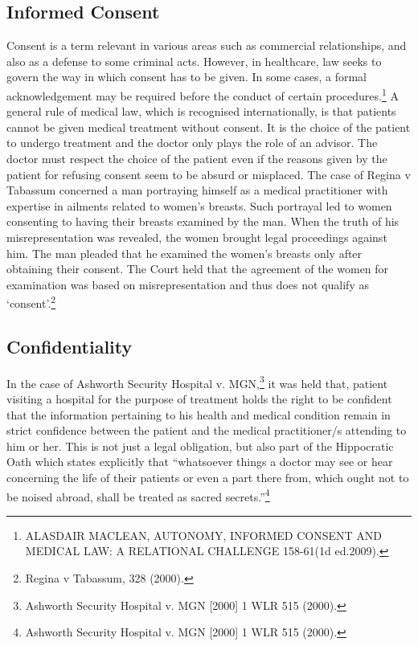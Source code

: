 \begin{multicols}{2}
\subsection*{Informed Consent}

\noi
Consent is a term relevant in various areas such as commercial relationships, and also
as a defense to some criminal acts. However, in healthcare, law seeks to govern the way
in which consent has to be given. In some cases, a formal acknowledgement may be
required before the conduct of certain procedures.\footnote{ALASDAIR MACLEAN, AUTONOMY, INFORMED CONSENT AND MEDICAL LAW: A RELATIONAL CHALLENGE 158-61(1d ed.2009).} A general rule of medical law, which
is recognised internationally, is that patients cannot be given medical treatment without
consent. It is the choice of the patient to undergo treatment and the doctor only plays
the role of an advisor. The doctor must respect the choice of the patient even if the
reasons given by the patient for refusing consent seem to be absurd or misplaced. The
case of Regina v Tabassum concerned a man portraying himself as a medical practitioner
with expertise in ailments related to women’s breasts. Such portrayal led to women
consenting to having their breasts examined by the man. When the truth of his
misrepresentation was revealed, the women brought legal proceedings against him. The
man pleaded that he examined the women’s breasts only after obtaining their consent.
The Court held that the agreement of the women for examination was based on
misrepresentation and thus does not qualify as ‘consent’.\footnote{Regina v Tabassum, 328 (2000).}

\subsection*{Confidentiality}

\noi
In the case of Ashworth Security Hospital v. MGN,\footnote{Ashworth Security Hospital v. MGN [2000] 1 WLR 515 (2000).} it was held that, patient visiting a hospital for the purpose of treatment holds the right to be confident that the information
pertaining to his health and medical condition remain in strict confidence between the
patient and the medical practitioner/s attending to him or her. This is not just a legal
obligation, but also part of the Hippocratic Oath which states explicitly that “whatsoever
things a doctor may see or hear concerning the life of their patients or even a part there
from, which ought not to be noised abroad, shall be treated as sacred secrets.”\footnote{Ashworth Security Hospital v. MGN [2000] 1 WLR 515 (2000).}


\end{multicols}
